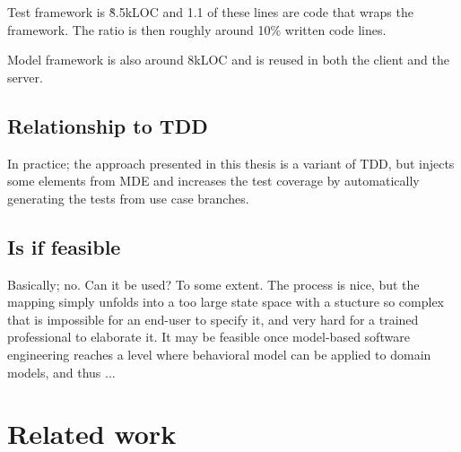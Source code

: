 Test framework is \~8.5kLOC and 1.1 of these lines are code that wraps the framework. The ratio is then roughly around 10\% written code lines.

Model framework is also around 8kLOC and is reused in both the client and the server.
\subsection{Relationship to TDD}
In practice; the approach presented in this thesis is a variant of TDD, but injects some elements from MDE and increases the test coverage by automatically generating the tests from use case branches.


\subsection{Is if feasible}
Basically; no. Can it be used? To some extent. The process is nice, but the mapping simply unfolds into a too large state space with a stucture so complex that is impossible for an end-user to specify it, and very hard for a trained professional to elaborate it. It may be feasible once model-based software engineering reaches a level where behavioral model can be applied to domain models, and thus ...

\section{Related work}